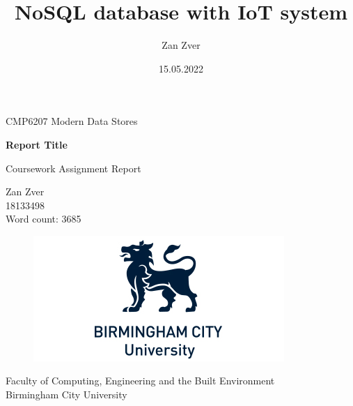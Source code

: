 \documentclass[12pt,a4paper]{article}
\title{NoSQL database with IoT system}
\author{Zan Zver}
\date{15.05.2022}
\newcommand{\authorName}{Zan Zver}
\newcommand{\authorID}{18133498}
\newcommand{\reportTitle}{Report Title}
\begin{document}
\begin{titlepage}
   \begin{center}
       CMP6207 Modern Data Stores
       \vspace*{0.5cm}

       \huge\textbf{\reportTitle} 

       \vspace{0.5cm}
        Coursework Assignment Report
            
       \vspace{1.5cm}

       \authorName \\
       \authorID\\
       \vspace{0.5cm}
       \large{Word count: 3685}


       \vfill
            
       \vspace{0.8cm}
     
       \begin{figure}[htp]
        \centering
        \includegraphics{logo}
        \end{figure}
            
       \large{Faculty of Computing, Engineering and the Built Environment \\
       Birmingham City University \\}
            
   \end{center}
\end{titlepage}
\pagestyle{fancy}
\fancyhf{}
\setlength{\headsep}{50pt}
\end{document}
